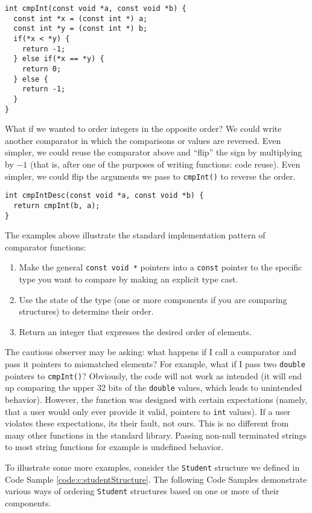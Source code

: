 \begin{verbatim}
int cmpInt(const void *a, const void *b) {
  const int *x = (const int *) a;
  const int *y = (const int *) b;
  if(*x < *y) {
    return -1;
  } else if(*x == *y) {
    return 0;
  } else {
    return -1;
  }
}
\end{verbatim}

What if we wanted to order integers in the opposite order?  We could write
another comparator in which the comparisons or values are reversed.  Even
simpler, we could reuse the comparator above and ``flip'' the sign by 
multiplying by $-1$ (that is, after one of the purposes of writing functions:
code reuse).  Even simpler, we could flip the arguments we pass to 
\texttt{cmpInt()} to reverse the order.

\begin{verbatim}
int cmpIntDesc(const void *a, const void *b) {
  return cmpInt(b, a);
}
\end{verbatim}

The examples above illustrate the standard implementation pattern of 
comparator functions:
\begin{enumerate}
  \item Make the general \texttt{const void *} pointers into a 
    \texttt{const} pointer to the specific type you want to compare
    by making an explicit type cast.
  \item Use the state of the type (one or more components if you are comparing
  	structures) to determine their order.
  \item Return an integer that expresses the desired order of elements.
\end{enumerate}

The cautious observer may be asking: what happens if I call a comparator
and pass it pointers to mismatched elements?  For example, what if I pass
two \texttt{double} pointers to \texttt{cmpInt()}?  Obviously, the
code will not work as intended (it will end up comparing the upper 32 bits of the
\texttt{double} values, which leads to unintended behavior).  However, 
the function was designed with certain expectations (namely, that a user would
only ever provide it valid, pointers to \texttt{int} values).  If
a user violates these expectations, its their fault, not ours.  This is no
different from many other functions in the standard library.  Passing non-null
terminated strings to most string functions for example is undefined behavior.

To illustrate some more examples, consider the \texttt{Student} structure
we defined in Code Sample \ref{code:c:studentStructure}.  The following Code
Samples demonstrate various ways of ordering \texttt{Student} structures based on one or more of their components.

